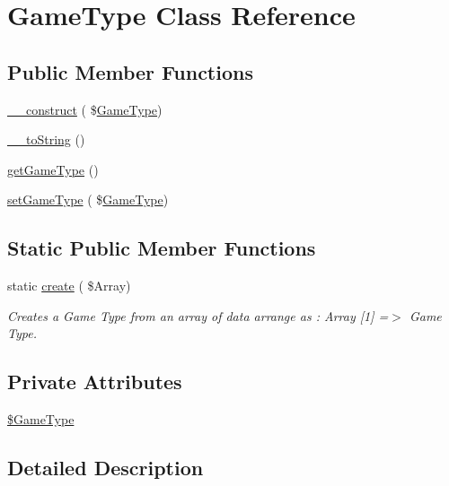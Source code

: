 \hypertarget{class_game_type}{}\section{Game\+Type Class Reference}
\label{class_game_type}
\subsection*{Public Member Functions}
\begin{DoxyCompactItemize}
\item 
\hyperlink{class_game_type_acd416aa9bf73a602044ca77ff9af7075}{\+\_\+\+\_\+construct} ( \$\hyperlink{class_game_type}{Game\+Type})
\item 
\hyperlink{class_game_type_aa44eff666eb42a95f850466ee75b689b}{\+\_\+\+\_\+to\+String} ()
\item 
\hyperlink{class_game_type_a533811f34eea98ef686d1f423568c695}{get\+Game\+Type} ()
\item 
\hyperlink{class_game_type_a8c027b9573c75e94bf80badad7d61eb2}{set\+Game\+Type} ( \$\hyperlink{class_game_type}{Game\+Type})
\end{DoxyCompactItemize}
\subsection*{Static Public Member Functions}
\begin{DoxyCompactItemize}
\item 
static \hyperlink{class_game_type_ad06317c8391fbd14723cb4e2d50cd98a}{create} ( \$Array)
\begin{DoxyCompactList}\small\item\em Creates a Game Type from an array of data arrange as \+: Array \mbox{[}1\mbox{]} =$>$ Game Type. \end{DoxyCompactList}\end{DoxyCompactItemize}
\subsection*{Private Attributes}
\begin{DoxyCompactItemize}
\item 
\hyperlink{class_game_type_ab16929c93bd4ed0f92e30d3c8bc983a5}{\$\+Game\+Type}
\end{DoxyCompactItemize}


\subsection{Detailed Description}


